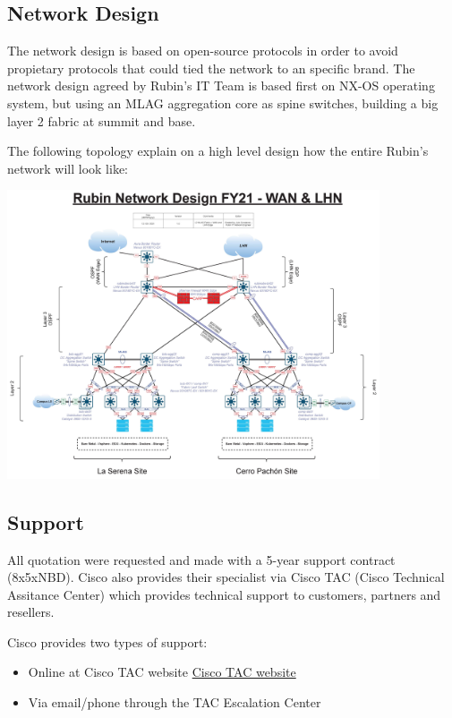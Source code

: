\subsection{Network Design}

The network design is based on open-source protocols in order to avoid propietary protocols that could tied the network to an specific brand. The network design agreed by Rubin's IT Team is based first on NX-OS operating system, but using an MLAG aggregation core as spine switches, building a big layer 2 fabric at summit and base. 

The following topology explain on a high level design how the entire Rubin's network will look like:

\includegraphics[width=11cm]{images/fy21-rubin-network.jpg}

\subsection{Support}

All quotation were requested and made with a 5-year support contract (8x5xNBD). Cisco also provides their specialist via Cisco TAC (Cisco Technical Assitance Center) which provides technical support to customers, partners and resellers.

Cisco provides two types of support:

\begin{itemize}
    \item Online at Cisco TAC website \href{http://www.cisco.com/tac}{Cisco TAC website}
    \item Via email/phone through the TAC Escalation Center
\end{itemize}

